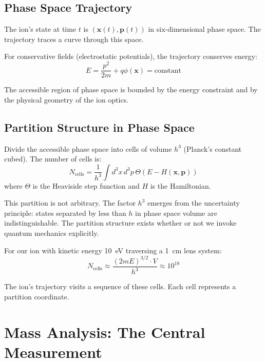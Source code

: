 \documentclass[12pt,a4paper]{article}
\theoremstyle{remark}
\begin{document}
\subsection{Phase Space Trajectory}

The ion's state at time $t$ is $(\mathbf{x}(t), \mathbf{p}(t))$ in six-dimensional phase space. The trajectory traces a curve through this space.

For conservative fields (electrostatic potentials), the trajectory conserves energy:
\begin{equation}
E = \frac{p^2}{2m} + q\phi(\mathbf{x}) = \text{constant}
\end{equation}

The accessible region of phase space is bounded by the energy constraint and by the physical geometry of the ion optics.

\subsection{Partition Structure in Phase Space}

Divide the accessible phase space into cells of volume $h^3$ (Planck's constant cubed). The number of cells is:
\begin{equation}
N_{\text{cells}} = \frac{1}{h^3} \int d^3x \, d^3p \, \Theta(E - H(\mathbf{x}, \mathbf{p}))
\end{equation}
where $\Theta$ is the Heaviside step function and $H$ is the Hamiltonian.

This partition is not arbitrary. The factor $h^3$ emerges from the uncertainty principle: states separated by less than $h$ in phase space volume are indistinguishable. The partition structure exists whether or not we invoke quantum mechanics explicitly.

For our ion with kinetic energy 10~eV traversing a 1~cm lens system:
\begin{equation}
N_{\text{cells}} \approx \frac{(2mE)^{3/2} \cdot V}{h^3} \approx 10^{18}
\end{equation}

The ion's trajectory visits a sequence of these cells. Each cell represents a partition coordinate.


\section{Mass Analysis: The Central Measurement}
\label{sec:mass-analysis}
\end{document}
